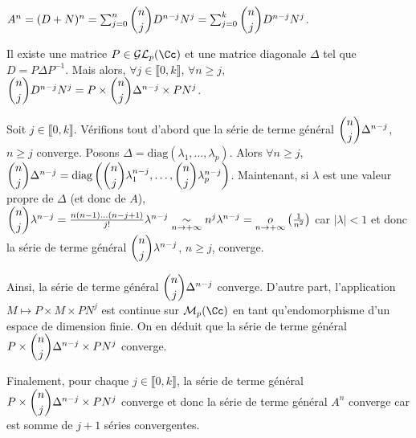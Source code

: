 {{\begin{center}
$A^n=(D+N)^n=\sum_{j=0}^{n}\dbinom{n}{j}D^{n-j}N^j=\sum_{j=0}^{k}\dbinom{n}{j}D^{n-j}N^j$.
\end{center}

Il existe une matrice $P\in\mathcal{GL}_p(\Cc)$ et une matrice diagonale $\Delta$ tel que $D=P\Delta P^{-1}$. Mais alors, $\forall j\in\llbracket0,k\rrbracket$, $\forall n\geqslant j$, $\dbinom{n}{j}D^{n-j}N^j=P\times\dbinom{n}{j}\Delta^{n-j}\times PN^j$.

Soit $j\in\llbracket0,k\rrbracket$. Vérifions tout d'abord que la série de terme général $\dbinom{n}{j}\Delta^{n-j}$, $n\geqslant j$ converge. Posons $\Delta=\text{diag}(\lambda_1,\ldots,\lambda_p)$. Alors $\forall n\geqslant j$, $\dbinom{n}{j}\Delta^{n-j}=\text{diag}\left(\dbinom{n}{j}\lambda_1^{n-j},\ldots,\dbinom{n}{j}\lambda_p^{n-j}\right)$. Maintenant, si $\lambda$ est une valeur propre de $\Delta$ (et donc de $A$), $\dbinom{n}{j}\lambda^{n-j}= \frac{n(n-1)\ldots(n-j+1)}{j!}\lambda^{n-j}\underset{n\rightarrow+\infty}{\sim}n^j\lambda^{n-j}=\underset{n\rightarrow+\infty}o\left( \frac{1}{n^2}\right)$ car $|\lambda|<1$ et donc la série de terme général $\dbinom{n}{j}\lambda^{n-j}$, $n\geqslant j$, converge.

Ainsi, la série de terme général $\dbinom{n}{j}\Delta^{n-j}$ converge. D'autre part, l'application $M\mapsto P\times M\times PN^j$ est continue sur $\mathcal{M}_p(\Cc)$ en tant qu'endomorphisme d'un espace de dimension finie. On en déduit que la série de terme général $P\times\dbinom{n}{j}\Delta^{n-j}\times PN^j$ converge.

Finalement, pour chaque $j\in\llbracket0,k\rrbracket$, la série de terme général $P\times\dbinom{n}{j}\Delta^{n-j}\times PN^j$ converge et donc la série de terme général $A^n$ converge car est somme de $j+1$ séries convergentes.
}
}
